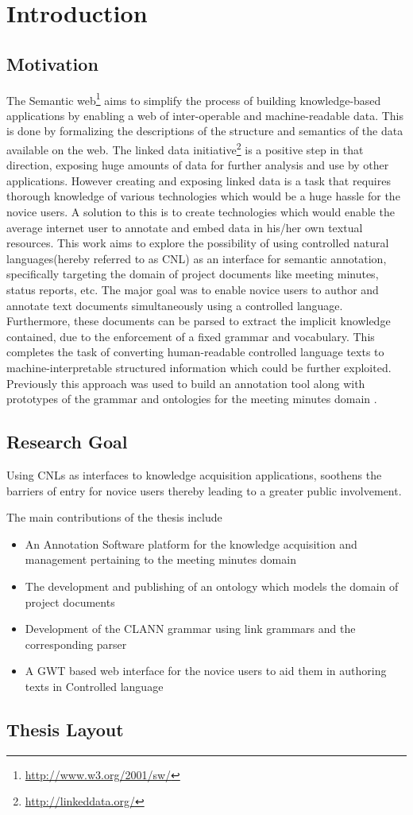 \chapter{Introduction}
\section{Motivation}
The Semantic web\footnote{\url{http://www.w3.org/2001/sw/}} aims to simplify the process of building knowledge-based applications by enabling a web of inter-operable and machine-readable data.  This is done by formalizing the descriptions of the structure and semantics of the data available on the web.  The linked data initiative\footnote{\url{http://linkeddata.org/}} is a positive step in that direction, exposing huge amounts of data for further analysis and use by other applications.  However creating and exposing linked data is a task that requires thorough knowledge of various technologies which would be a huge hassle for the novice users.  A solution to this is to create technologies which would enable the average internet user to annotate and embed data in his/her own textual resources.  This work aims to explore the possibility of using controlled natural languages(hereby referred to as CNL) as an interface for semantic annotation, specifically targeting the domain of project documents like meeting minutes,  status reports, etc.  The major goal was to enable novice users to author and annotate text documents simultaneously using a controlled language.  Furthermore, these documents can be parsed to extract the implicit knowledge contained, due to the enforcement of a fixed grammar and vocabulary. This completes the task of converting human-readable controlled language texts to machine-interpretable structured information which could be further exploited. Previously this approach was used to build an annotation tool along with prototypes of the grammar and ontologies for the meeting minutes domain \cite{cnl09}.

\section{Research Goal}
Using CNLs as interfaces to knowledge acquisition applications, soothens the barriers of entry for novice users thereby leading to a greater public involvement.  

The main contributions of the thesis include 
\begin{itemize}

\item{An Annotation Software platform for the knowledge acquisition and management pertaining to the meeting minutes domain}
\item{The development and publishing of an  ontology which models the domain of project documents}
\item{Development of the CLANN grammar using link grammars and the corresponding parser}
\item{A GWT based web interface for the novice users to aid them in authoring texts in Controlled language}
\end{itemize}  

\section{Thesis Layout}

